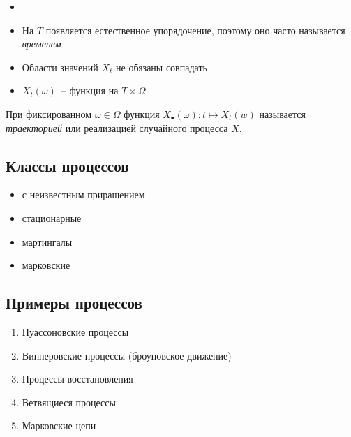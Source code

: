 \begin{note}
    \begin{itemize}
        \item[] 
        \item На $T$ появляется естественное упорядочение, поэтому оно часто называется \textit{временем}
        \item Области значений $X_t$ не обязаны совпадать
        \item $X_t(\omega)$~-- функция на $T\times\Omega$
    \end{itemize}
    
\end{note}

\begin{definition}
    При фиксированном $\omega \in \Omega$ функция $X_{\bullet}(\omega): t \mapsto X_t(w)$ называется \textit{траекторией} или реализацией случайного процесса $X$.
\end{definition}

\subsection*{Классы процессов}

\begin{itemize}[noitemsep, topsep=1pt]
    \item с неизвестным приращением
    \item стационарные
    \item мартингалы
    \item марковские
\end{itemize}

\subsection*{Примеры процессов}
\begin{enumerate}[noitemsep, topsep=1pt]
    \item Пуассоновские процессы 
    \item Виннеровские процессы (броуновское движение)
    \item Процессы восстановления
    \item Ветвящиеся процессы
    \item Марковские цепи
\end{enumerate}

